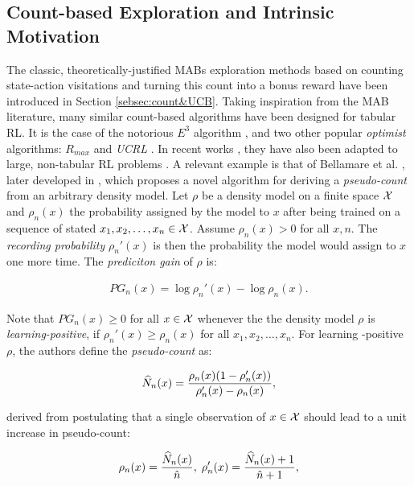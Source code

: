\subsection{Count-based Exploration and Intrinsic Motivation}
The classic, theoretically-justified \gls{MAB}s exploration methods based on counting state-action visitations and turning this count into a bonus reward have been introduced in Section \ref{sebsec:count&UCB}. Taking inspiration from the \gls{MAB} literature, many similar count-based algorithms have been designed for tabular \gls{RL}. It is the case of the notorious $E^3$ algorithm \cite{kearns2002near}, and two other popular \emph{optimist} algorithms: $R_{max}$ \cite{brafman2002r} and \emph{UCRL} \cite{auer2007logarithmic}. 
In recent works \cite{bellemare2016unifying, tang2017exploration, ostrovski2017count, choshen2018dora}, they have also been adapted to large, non-tabular \gls{RL} problems . A relevant example is that of Bellamare et al. \cite{bellemare2016unifying}, later developed in \cite{ostrovski2017count}, which proposes a novel algorithm for deriving a \emph{pseudo-count} from an arbitrary density model.
Let $\rho$ be a density model on a finite space $\mathcal{X}$ and $\rho_n(x)$ the probability assigned by the model to $x$ after being trained on a sequence of stated $x_1,x_2,\dots,x_n\in\mathcal{X}$. Assume $\rho_n(x)>0$ for all $x,n$. The \emph{recording probability} $\rho_n'(x)$ is then the probability the model would assign to $x$ one more time. The \emph{prediciton gain} of $\rho$ is:

\begin{align}
PG_n(x) = \log\rho_n'(x) - \log\rho_n(x).
\end{align}

Note that $PG_n(x)\geq0$ for all $x\in\mathcal{X}$ whenever the the density model $\rho$ is \emph{learning-positive}, \ie if $\rho_n'(x)\geq\rho_n(x)$ for all $x_1,x_2,\dots,x_n$. For learning -positive $\rho$, the authors define the \emph{pseudo-count} as:

\begin{align}
\widehat{N}_n(x) = \frac{\rho_n(x)(1-\rho_n'(x))}{\rho_n'(x)-\rho_n(x)},
\end{align}

derived from postulating that a single observation of $x\in\mathcal{X}$ should lead to a unit increase in pseudo-count:

\begin{align}
\rho_n(x) = \frac{\widehat{N}_n(x)}{\hat{n}}, \; \rho_n'(x) = \frac{\widehat{N}_n(x)+1}{\hat{n}+1},
\end{align}


